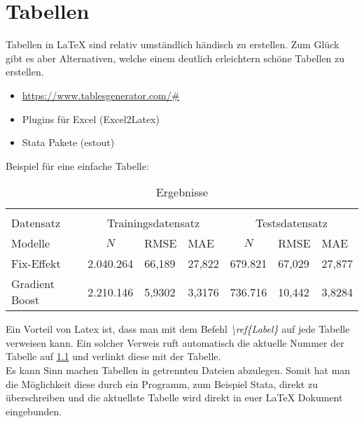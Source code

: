 \chapter{Tabellen}
Tabellen in LaTeX sind relativ umständlich händisch zu erstellen. Zum Glück gibt es aber Alternativen, welche einem deutlich erleichtern schöne Tabellen zu erstellen.
\begin{itemize}
    \item \url{https://www.tablesgenerator.com/#}
    \item Plugins für Excel (Excel2Latex)
    \item Stata Pakete (estout)
\end{itemize}

Beispiel für eine einfache Tabelle:
\begin{table}[h]
\centering
\caption{Ergebnisse}
\label{tab:easy_table}
\begin{tabular}{l|lll|lll}
\hline\hline \multicolumn{4}{l}{} \\ [-10pt]
Datensatz & \multicolumn{3}{c|}{Trainingsdatensatz} & \multicolumn{3}{c}{Testsdatensatz} \\
Modelle &                \multicolumn{1}{c}{ $N$} &     RMSE &      MAE &           \multicolumn{1}{c}{ $N$}&      RMSE &      MAE \\
\midrule
Fix-Effekt              &           2.040.264 & 66,189     &     27,822 &    679.821 & 67,029 & 27,877 \\
Gradient Boost    &           2.210.146 & 5,9302     &     3,3176 &    736.716 & 10,442 &  3,8284 \\
\hline\hline 
\end{tabular}

\end{table}

Ein Vorteil von Latex ist, dass man mit dem Befehl \emph{ \textbackslash ref\{Label\} } auf jede Tabelle verweisen kann. Ein solcher Verweis ruft automatisch die aktuelle Nummer der Tabelle auf \ref{tab:easy_table} und verlinkt diese mit der Tabelle.\\
Es kann Sinn machen Tabellen in getrennten Dateien abzulegen. Somit hat man die Möglichkeit diese durch ein Programm, zum Beispiel Stata, direkt zu überschreiben und die aktuellste Tabelle wird direkt in euer LaTeX Dokument eingebunden.